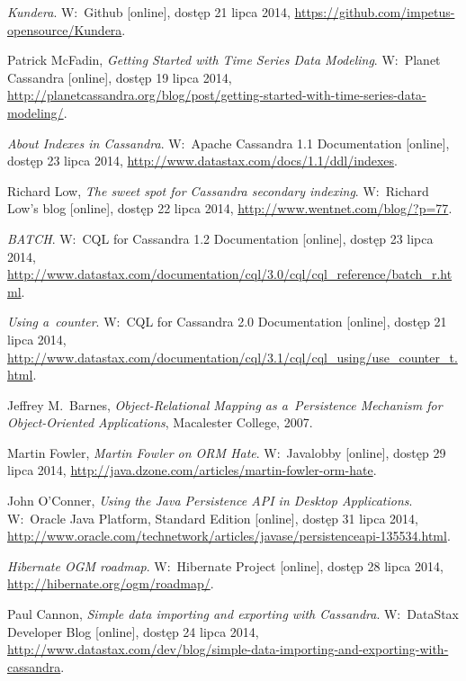 \begin{thebibliography}{9}
\emph{Kundera}. W:~Github [online], dostęp 21 lipca 2014, \linebreak \url{https://github.com/impetus-opensource/Kundera}.

Patrick McFadin, \emph{Getting Started with Time Series Data Modeling}. W:~Planet Cassandra [online], dostęp 19 lipca 2014, \url{http://planetcassandra.org/blog/post/getting-started-with-time-series-data-modeling/}.

\emph{About Indexes in Cassandra}. W:~Apache Cassandra 1.1 Documentation [online], dostęp 23 lipca 2014, \linebreak \url{http://www.datastax.com/docs/1.1/ddl/indexes}.

Richard Low, \emph{The sweet spot for Cassandra secondary indexing}. W:~Richard Low's blog [online], dostęp 22 lipca 2014, \linebreak \url{http://www.wentnet.com/blog/?p=77}.

\emph{BATCH}. W:~CQL for Cassandra 1.2 Documentation [online], dostęp 23 lipca 2014, \url{http://www.datastax.com/documentation/cql/3.0/cql/cql_reference/batch_r.html}.

\emph{Using a~counter}. W:~CQL for Cassandra 2.0 Documentation [online], dostęp 21 lipca 2014, \url{http://www.datastax.com/documentation/cql/3.1/cql/cql_using/use_counter_t.html}.

Jeffrey M.~Barnes, \emph{Object-Relational Mapping as a~Persistence Mechanism for Object-Oriented Applications}, Macalester College, 2007.

Martin Fowler, \emph{Martin Fowler on ORM Hate}. W:~Javalobby [online], dostęp 29 lipca 2014, \linebreak \url{http://java.dzone.com/articles/martin-fowler-orm-hate}.

John O'Conner, \emph{Using the Java Persistence API in Desktop Applications}. W:~Oracle Java Platform, Standard Edition [online], dostęp 31 lipca 2014, \url{http://www.oracle.com/technetwork/articles/javase/persistenceapi-135534.html}.

\emph{Hibernate OGM roadmap}. W:~Hibernate Project [online], dostęp 28 lipca 2014, \url{http://hibernate.org/ogm/roadmap/}.

Paul Cannon, \emph{Simple data importing and exporting with Cassandra}. W:~DataStax Developer Blog [online], dostęp 24 lipca 2014, \url{http://www.datastax.com/dev/blog/simple-data-importing-and-exporting-with-cassandra}.


\end{thebibliography}
